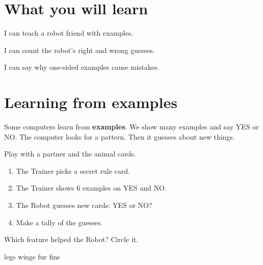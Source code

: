 
\section{What you will learn}
\begin{ican}
  \item I can teach a robot friend with examples.
  \item I can count the robot's right and wrong guesses.
  \item I can say why one-sided examples cause mistakes.
\end{ican}

\section{Learning from examples}
Some computers learn from \textbf{examples}. We show many examples and say YES or NO. The computer looks for a pattern. Then it guesses about new things.

\begin{exercise}
Play with a partner and the animal cards.
\begin{enumerate}[leftmargin=1.4em,itemsep=2pt]
  \item The Trainer picks a secret rule card.
  \item The Trainer shows 6 examples on YES and NO.
  \item The Robot guesses new cards: YES or NO?
  \item Make a tally of the guesses.
\end{enumerate}
\begin{center}
\end{center}
Which feature helped the Robot? Circle it.

\begin{center}
\Large legs \qquad wings \qquad fur \qquad fins
\end{center}
\end{exercise}

